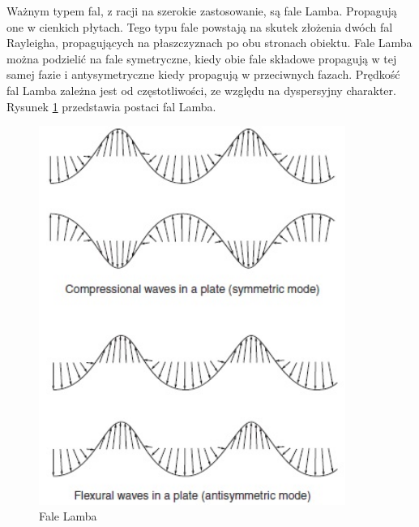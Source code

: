 Ważnym typem fal, z racji na szerokie zastosowanie, są fale Lamba. Propagują one w cienkich płytach. Tego typu fale powstają na skutek złożenia dwóch fal Rayleigha, propagujących na płaszczyznach po obu stronach obiektu. Fale Lamba można podzielić na fale symetryczne, kiedy obie fale składowe propagują w tej samej fazie i antysymetryczne kiedy propagują w przeciwnych fazach. Prędkość fal Lamba zależna jest od częstotliwości, ze względu na dyspersyjny charakter. Rysunek \ref{fig:fala_lamba} przedstawia postaci fal Lamba.

\begin{figure}[h]
\centering
\includegraphics[width=10cm]{Zdjecia/2/fala_lamba2}
\caption{Fale Lamba \cite{bartek_rose}}
\label{fig:fala_lamba}
\end{figure}






















